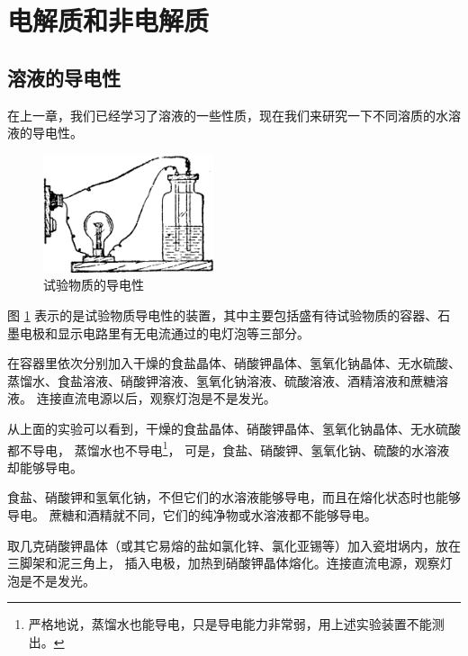\section{电解质和非电解质}\label{sec:5-1}

\subsection{溶液的导电性}

在上一章，我们已经学习了溶液的一些性质，现在我们来研究一下不同溶质的水溶液的导电性。

\begin{figure}
    \centering
    \includegraphics[width=5cm]{../pic/czhx1-ch5-1}
    \caption{试验物质的导电性}\label{fig:5-1}
\end{figure}

\wrapfiguretrick

\begin{shiyan}
    图 \ref{fig:5-1} 表示的是试验物质导电性的装置，其中主要包括盛有待试验物质的容器、石墨电极和显示电路里有无电流通过的电灯泡等三部分。

    在容器里依次分别加入干燥的食盐晶体、硝酸钾晶体、氢氧化钠晶体、无水硫酸、
    蒸馏水、食盐溶液、硝酸钾溶液、氢氧化钠溶液、硫酸溶液、酒精溶液和蔗糖溶液。
    连接直流电源以后，观察灯泡是不是发光。
\end{shiyan}


从上面的实验可以看到，干燥的食盐晶体、硝酸钾晶体、氢氧化钠晶体、无水硫酸都不导电，
蒸馏水也不导电\footnote{严格地说，蒸馏水也能导电，只是导电能力非常弱，用上述实验装置不能测出。}，
可是，食盐、硝酸钾、氢氧化钠、硫酸的水溶液却能够导电。

食盐、硝酸钾和氢氧化钠，不但它们的水溶液能够导电，而且在熔化状态时也能够导电。
蔗糖和酒精就不同，它们的纯净物或水溶液都不能够导电。

\begin{shiyan}
    取几克硝酸钾晶体（或其它易熔的盐如氯化锌、氯化亚锡等）加入瓷坩埚内，放在三脚架和泥三角上，
    插入电极，加热到硝酸钾晶体熔化。连接直流电源，观察灯泡是不是发光。
\end{shiyan}

